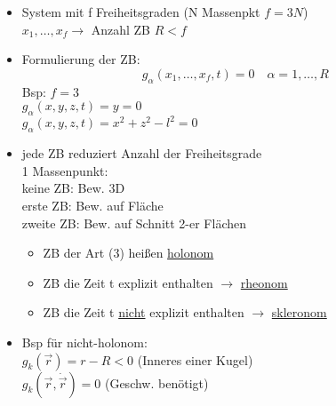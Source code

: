 \documentclass[titlepage,12pt,a4paper,ngerman]{report}
\begin{document}
\begin{itemize}
	\item System mit f Freiheitsgraden (N Massenpkt $ f=3N $)\\
	$ x_1,\dots,x_f \rightarrow $ Anzahl ZB $ R < f $
	\item Formulierung der ZB:\\
	\begin{equation*}
	g_\alpha (x_1,\dots,x_f,t) = 0 \quad \alpha = 1, \dots ,R \tag{3}
	\end{equation*}
	Bsp: $ f=3 $\\
	$ g_\alpha(x,y,z,t) = y = 0 $\\
	$ g_\alpha(x,y,z,t) = x^2 + z^2 - l^2 = 0 $
	\item jede ZB reduziert Anzahl der Freiheitsgrade\\
	1 Massenpunkt:\\
	keine ZB: Bew. 3D\\
	erste ZB: Bew. auf Fläche\\
	zweite ZB: Bew. auf Schnitt 2-er Flächen
	\begin{itemize}
		\item ZB der Art (3) heißen \underline{holonom}
		\item ZB die Zeit t explizit enthalten $ \rightarrow $ \underline{rheonom}
		\item ZB die Zeit t \underline{nicht} explizit enthalten $ \rightarrow $ \underline{skleronom}
	\end{itemize}
	\item Bsp für nicht-holonom:\\
	$ g_k (\vec{r}) = r-R < 0 $ (Inneres einer Kugel)\\
	$ g_k(\vec{r},\dot{\vec{r}})  = 0 $ (Geschw. benötigt)
\end{itemize}
\end{document}
